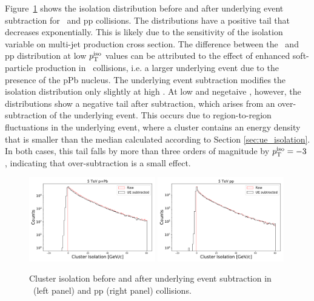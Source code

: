 Figure~\ref{fig:iso_ue} shows the isolation distribution before and after underlying event subtraction for \pPb~and pp collisions. The distributions have a positive tail that decreases exponentially. This is likely due to the sensitivity of the isolation variable on multi-jet production cross section. The difference between the \pPb~and pp distribution at low $p_{\mathrm{T}}^\mathrm{iso}$ values can be attributed to the effect of enhanced soft-particle production in \pPb~collisions, i.e. a larger underlying event due to the presence of the pPb nucleus. The underlying event subtraction modifies the isolation distribution only slightly at high \pt. At low and negetaive \pt, however, the distributions show a negative tail after subtraction, which arises from an over-subtraction of the underlying event. This occurs due to region-to-region fluctuations in the underlying event, where a cluster contains an energy density that is smaller than the median calculated according to Section \ref{sec:ue_isolation}. In both cases, this tail falls by more than three orders of magnitude by $p_{\mathrm{T}}^\mathrm{iso}=-3$ \GeVc, indicating that over-subtraction is a small effect.   

\begin{figure}[hbtp]
\center
\includegraphics[width=0.49\textwidth]{Data_Analysis/Isolation/IsolationWithUESubtraction_Skimmed_13def_root}
\includegraphics[width=0.49\textwidth]{Data_Analysis/Isolation/IsolationWithUESubtraction_Skimmed_17q_root}
\caption{Cluster isolation before and after underlying event subtraction in \pPb~(left panel) and pp (right panel) collisions.}
\label{fig:iso_ue}
\end{figure}

